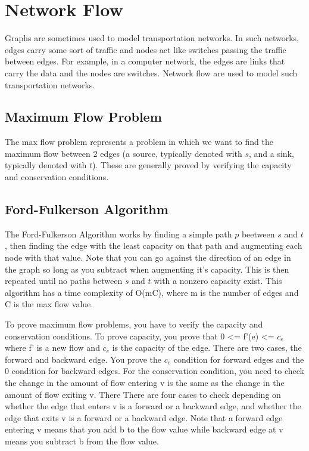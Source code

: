 \documentclass{article}
\begin{document}
\section{Network Flow}
Graphs are sometimes used to model transportation networks. In
such networks, edges carry some sort of traffic and nodes act like switches passing the
traffic between edges. For example, in a computer network, the edges are links that carry
the data and the nodes are switches. Network flow are used to model such transportation
networks.

\subsection{Maximum Flow Problem}
The max flow problem represents a problem in which we want to find the maximum flow between
2 edges (a source, typically denoted with $s$, and a sink, typically denoted with $t$). These
are generally proved by verifying the capacity and conservation conditions.

\subsection{Ford-Fulkerson Algorithm}
The Ford-Fulkerson Algorithm works by finding a simple path $p$ beetween $s$ and $t$, then finding
the edge with the least capacity on that path and augmenting each node with that value.
Note that you can go against the direction of an edge in the graph so long as you subtract when augmenting
it's capacity. This is then repeated until no paths between $s$ and $t$ with a nonzero capacity exist.
This algorithm has a time complexity of O(mC), where m is the number of edges and C is the max flow
value.


To prove maximum flow problems, you have to verify the capacity and conservation conditions. 
To prove capacity, you prove that 0 <= f'(e) <= $c_e$ where f' is a new flow and $c_e$ is the 
capacity of the edge. There are two cases, the forward and backward edge. You prove the $c_e$ 
condition for forward edges and the 0
condition for backward edges. For the conservation condition, you need to check the change in 
the amount of flow entering v is the same as the change in the amount of flow exiting v. There 
There are four cases to check depending on whether the edge that enters v is a forward or a backward 
edge, and whether the edge that exits v is a forward or a backward 
edge. Note that a forward edge entering v means that you add b to the flow value while 
backward edge at v means you subtract b from the flow value.
\end{document}
